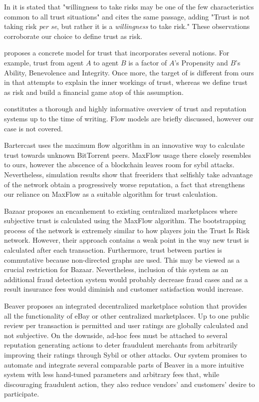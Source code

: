   In \cite{jgs} it is stated that "willingness to take risks may be one of the few characteristics common to all trust
  situations" and \cite{mds} cites the same passage, adding "Trust is not taking risk \textit{per se}, but rather it is a
  \textit{willingness} to take risk." These observations corroborate our choice to define trust as risk.

  \cite{mds} proposes a concrete model for trust that incorporates several notions. For example, trust from agent $A$ to
  agent $B$ is a factor of $A$'s Propensity and $B$'s Ability, Benevolence and Integrity. Once more, the target of \cite{mds}
  is different from ours in that \cite{mds} attempts to explain the inner workings of trust, whereas we define trust as risk
  and build a financial game atop of this assumption.

  \cite{jib} constitutes a thorough and highly informative overview of trust and reputation systems up to the time of
  writing. Flow models are briefly discussed, however our case is not covered.

  Bartercast \cite{bartercast} uses the maximum flow algorithm in an innovative way to calculate trust towards unknown
  BitTorrent peers. MaxFlow usage there closely resembles to ours, however the abscence of a blockchain leaves room for
  sybil attacks. Nevertheless, simulation results show that freeriders that selfishly take advantage of the network obtain a
  progressively worse reputation, a fact that strengthens our reliance on MaxFlow as a suitable algorithm for trust
  calculation.

  Bazaar \cite{bazaar} proposes an encanhement to existing centralized marketplaces where subjective trust is calculated
  using the MaxFlow algorithm. The bootstrapping process of the network is extremely similar to how players join the Trust Is
  Risk network. However, their approach contains a weak point in the way new trust is calculated after each transaction.
  Furthermore, trust between parties is commutative because non-directed graphs are used. This may be viewed as a crucial
  restriction for Bazaar.  Nevertheless, inclusion of this system as an additional fraud detection system would probably
  decrease fraud cases and as a result insurance fees would diminish and customer satisfaction would increase.

  Beaver \cite{beaver} proposes an integrated decentralized marketplace solution that provides all the functionality of eBay
  or other centralized marketplaces. Up to one public review per transaction is permitted and user ratings are globally
  calculated and not subjective. On the downside, ad-hoc fees must be attached to several reputation generating actions to
  deter fraudulent merchants from arbitrarily improving their ratings through Sybil or other attacks. Our system promises to
  automate and integrate several comparable parts of Beaver in a more intuitive system with less hand-tuned parameters and
  arbitrary fees that, while discouraging fraudulent action, they also reduce vendors' and customers' desire to participate.


